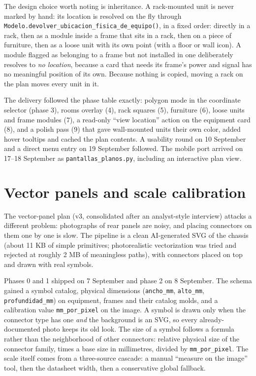 \documentclass[10.4pt,twocolumn]{article}
\begin{document}
The design choice worth noting is inheritance. A rack-mounted unit is never marked by hand: its location is resolved on the fly through \texttt{Modelo.devolver\_ubicacion\_fisica\_de\_equipo()}, in a fixed order: directly in a rack, then as a module inside a frame that sits in a rack, then on a piece of furniture, then as a loose unit with its own point (with a floor or wall icon). A module flagged as belonging to a frame but not installed in one deliberately resolves to \emph{no location}, because a card that needs its frame's power and signal has no meaningful position of its own. Because nothing is copied, moving a rack on the plan moves every unit in it.

The delivery followed the phase table exactly: polygon mode in the coordinate selector (phase 3), rooms overlay (4), rack squares (5), furniture (6), loose units and frame modules (7), a read-only ``view location'' action on the equipment card (8), and a polish pass (9) that gave wall-mounted units their own color, added hover tooltips and cached the plan contents. A usability round on 10 September and a direct menu entry on 19 September followed. The mobile port arrived on 17--18 September as \texttt{pantallas\_planos.py}, including an interactive plan view.

\section{Vector panels and scale calibration}

The vector-panel plan (v3, consolidated after an analyst-style interview) attacks a different problem: photographs of rear panels are noisy, and placing connectors on them one by one is slow. The pipeline is a clean AI-generated SVG of the chassis (about 11 KB of simple primitives; photorealistic vectorization was tried and rejected at roughly 2 MB of meaningless paths), with connectors placed on top and drawn with real symbols.

Phases 0 and 1 shipped on 7 September and phase 2 on 8 September. The schema gained a symbol catalog, physical dimensions (\texttt{ancho\_mm}, \texttt{alto\_mm}, \texttt{profundidad\_mm}) on equipment, frames and their catalog molds, and a calibration value \texttt{mm\_por\_pixel} on the image. A symbol is drawn only when the connector type has one \emph{and} the background is an SVG, so every already-documented photo keeps its old look. The size of a symbol follows a formula rather than the neighborhood of other connectors: relative physical size of the connector family, times a base size in millimetres, divided by \texttt{mm\_por\_pixel}. The scale itself comes from a three-source cascade: a manual ``measure on the image'' tool, then the datasheet width, then a conservative global fallback.
\end{document}
